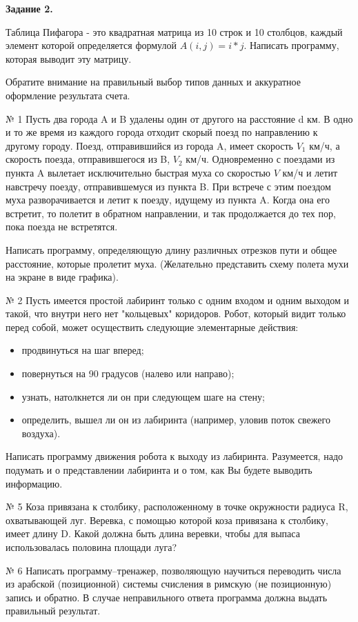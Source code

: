 {\bf Задание 2.}

Таблица Пифагора - это квадратная матрица из 10 строк и 10 столбцов, каждый элемент которой определяется формулой $A(i, j) = i*j.$ 
Написать программу, которая выводит эту матрицу.

Обратите внимание на правильный выбор типов данных и аккуратное оформление результата счета.

№ 1 Пусть два города A и B удалены один от другого на расстояние d км. В одно и то же время из каждого города отходит скорый поезд по направлению к другому городу. Поезд, отправившийся из города A, имеет скорость $V_1$ км/ч, 
а скорость поезда, отправившегося из B, $V_2$ км/ч. Одновременно с поездами из пункта A вылетает исключительно быстрая муха со скоростью $V$ км/ч и летит навстречу поезду, отправившемуся из пункта B. 
При встрече с этим поездом муха разворачивается и летит к поезду, идущему из пункта A. Когда она его встретит, то полетит в обратном направлении, и так продолжается до тех пор, пока поезда не встретятся.

Написать программу, определяющую длину различных отрез­ков пути и общее расстояние, которые пролетит муха. (Желательно представить схему полета мухи на экране в виде графика).

№ 2 Пусть имеется простой лабиринт только с одним входом и одним выходом и такой, что внутри него нет "кольцевых" коридоров. Робот, который видит только перед собой, может осуще­ствить следующие элементарные действия:
\begin{itemize}
	\item продвинуться на шаг вперед;
	\item повернуться на 90 градусов (налево или направо);
	\item узнать, натолкнется ли он при следующем шаге на стену;
	\item определить, вышел ли он из лабиринта (например, уловив поток свежего воздуха).
\end{itemize}

Написать программу движения робота к выходу из лабиринта. Разумеется, надо подумать и о представлении лабиринта и о том, как Вы будете выводить информацию.


№ 5 Коза привязана к столбику, расположенному в точке окружности радиуса R, охватывающей луг. Веревка, с помощью которой коза привязана к столбику, имеет длину D. Какой должна быть длина веревки, чтобы для выпаса использовалась половина площади луга?

№ 6 Написать программу--тренажер, позволяющую научиться переводить числа из арабской (позиционной) системы счисления в римскую (не позиционную) запись и обратно. В случае неправильного ответа программа должна выдать правильный результат.

